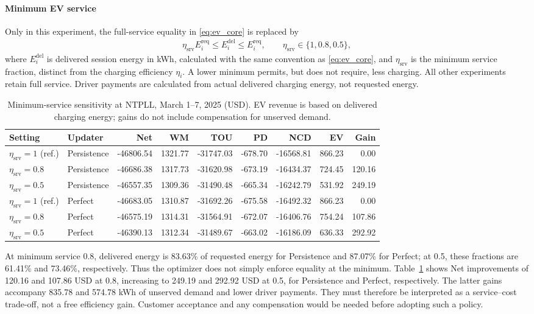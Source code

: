 \documentclass[final,5p,times]{elsarticle}
\newcommand{\req}{\mathrm{req}}
\begin{document}
\paragraph{Minimum EV service}
Only in this experiment, the full-service equality in \eqref{eq:ev_core}
is replaced by
\begin{align}
\eta_{\mathrm{srv}}E_i^{\req}
\le E_i^{\mathrm{del}} \le E_i^{\req},\qquad
\eta_{\mathrm{srv}}\in\{1,0.8,0.5\},
\label{eq:sensitivity_service}
\end{align}
where $E_i^{\mathrm{del}}$ is delivered session energy in kWh, calculated
with the same convention as \eqref{eq:ev_core}, and
$\eta_{\mathrm{srv}}$ is the minimum service fraction, distinct from the
charging efficiency $\eta_i$. A lower minimum permits, but does not require,
less charging. All other experiments retain full service. Driver payments
are calculated from actual delivered charging energy, not requested energy.
\begin{table}[p]
\centering
\caption{Minimum-service sensitivity at NTPLL, March 1--7, 2025 (USD). EV revenue is based on delivered charging energy; gains do not include compensation for unserved demand.}
\label{tab:weekly_eta}
\footnotesize
\setlength{\tabcolsep}{3pt}
\begin{tabular}{llrrrrrrr}
\toprule
Setting & Updater & Net & WM & TOU & PD & NCD & EV & Gain \\
\midrule
$\eta_{\mathrm{srv}}=1$ (ref.) & Persistence & -46806.54 & 1321.77 & -31747.03 & -678.70 & -16568.81 & 866.23 & 0.00 \\
$\eta_{\mathrm{srv}}=0.8$ & Persistence & -46686.38 & 1317.73 & -31620.98 & -673.19 & -16434.37 & 724.45 & 120.16 \\
$\eta_{\mathrm{srv}}=0.5$ & Persistence & -46557.35 & 1309.36 & -31490.48 & -665.34 & -16242.79 & 531.92 & 249.19 \\
\midrule
$\eta_{\mathrm{srv}}=1$ (ref.) & Perfect & -46683.05 & 1310.87 & -31692.26 & -675.58 & -16492.32 & 866.23 & 0.00 \\
$\eta_{\mathrm{srv}}=0.8$ & Perfect & -46575.19 & 1314.31 & -31564.91 & -672.07 & -16406.76 & 754.24 & 107.86 \\
$\eta_{\mathrm{srv}}=0.5$ & Perfect & -46390.13 & 1312.34 & -31489.67 & -663.02 & -16186.09 & 636.33 & 292.92 \\
\bottomrule
\end{tabular}
\end{table}

At minimum service 0.8, delivered energy is 83.63\% of requested energy for
Persistence and 87.07\% for Perfect; at 0.5, these fractions are 61.41\% and
73.46\%, respectively. Thus the optimizer does not simply enforce equality
at the minimum. Table~\ref{tab:weekly_eta} shows Net improvements of 120.16
and 107.86 USD at 0.8, increasing to 249.19 and 292.92 USD at 0.5, for
Persistence and Perfect, respectively. The latter gains accompany 835.78
and 574.78 kWh of unserved demand and lower driver payments. They must
therefore be interpreted as a service--cost trade-off, not a free efficiency
gain. Customer acceptance and any compensation would be needed before
adopting such a policy.
\end{document}
